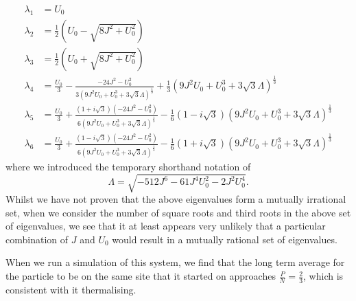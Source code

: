 \documentclass[prb, twocolumn, final]{revtex4-1}
\theoremstyle{plain}
\begin{document}
\begin{align*}
    \lambda_{1}
    &=
    U_{0}
    \\
    \lambda_{2}
    &=
    \frac{1}{2} \left(U_{0} - \sqrt{8J^2 + U_{0}^2}\right)
    \\
    \lambda_{3}
    &=
    \frac{1}{2}(U_{0} + \sqrt{8J^2 + U_{0}^2})
    \\
    \lambda_{4}
    &=
    \frac{U_{0}}{3} -
    \frac{-24 J^{2} - U_{0}^2}
         {
          3 \left (
                9 J^{2} U_{0} + U_{0}^3 + 3 \sqrt{3} \Lambda
            \right)^{\frac{1}{3}}}
    +
    \frac{1}{3}
    \left ( 9 J^{2} U_{0} + U_{0}^{3} + 3\sqrt{3} \Lambda \right )^{\frac{1}{3}}
    \\
    \lambda_{5}
    &=
    \frac{U_{0}}{3} +
    \frac{(1 + i \sqrt{3})(-24 J^{2} - U_{0}^{2})}
         {6
          \left (
              9 J^{2} U_{0} + U_{0}^{3} + 3 \sqrt{3} \Lambda
          \right )^{\frac{1}{3}}
         }
    -
    \frac{1}{6} (1 - i \sqrt{3})
    \left (
        9 J^{2} U_{0} + U_{0}^{3} +
        3 \sqrt{3} \Lambda
    \right )^{\frac{1}{3}}
    \\
    \lambda_{6}
    &=
    \frac{U_{0}}{3} +
    \frac{(1 - i\sqrt{3})(-24 J^{2} - U_{0}^{2})}
         {6
          \left (
              9 J^{2} U_{0} + U_{0}^{3} +
              3 \sqrt{3} \Lambda
          \right )^{\frac{1}{3}}
         }
    -
    \frac{1}{6} (1 + i\sqrt{3})
    \left (
        9 J^{2} U_{0} + U_{0}^{3} +
        3 \sqrt{3} \Lambda
    \right )^{\frac{1}{3}}
\end{align*}
where we introduced the temporary shorthand notation of
\begin{equation*}
    \Lambda = \sqrt{-512 J^{6} - 61 J^{4} U_{0}^{2} - 2 J^{2} U_{0}^{4}}.
\end{equation*}
Whilst we have not proven that the above eigenvalues form a mutually irrational
set, when we consider the number of square roots and third roots in the above
set of eigenvalues, we see that it at least appears very unlikely that a
particular combination of $J$ and $U_{0}$ would result in a mutually rational
set of eigenvalues.

When we run a simulation of this system, we find that the long term average
for the particle to be on the same site that it started on approaches
$\frac{P}{N}=\frac{2}{3}$, which is consistent with it thermalising.
\end{document}
